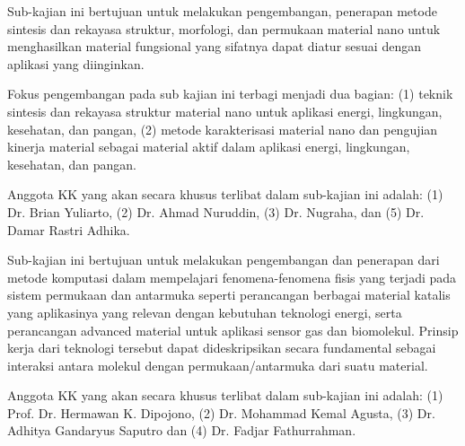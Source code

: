 \documentclass[a0,landscape]{a0poster}
\begin{document}
\begin{multicols}{3}
{\LARGE
\begin{tcolorbox}[
  colback=blue!5,
  colframe=blue!40!black,
  title=Sintesis dan Rekayasa permukaan material nano]
\vspace{1cm}
Sub-kajian ini bertujuan untuk melakukan pengembangan,
penerapan metode sintesis dan rekayasa 
struktur, morfologi, dan permukaan material nano untuk menghasilkan material fungsional 
yang sifatnya dapat diatur sesuai dengan aplikasi yang diinginkan.

Fokus pengembangan pada sub kajian ini terbagi menjadi dua bagian: (1) teknik sintesis dan 
rekayasa struktur material nano untuk aplikasi energi, lingkungan, kesehatan, dan pangan, 
(2) metode karakterisasi material nano dan pengujian kinerja material sebagai material 
aktif dalam aplikasi energi, lingkungan, kesehatan, dan pangan.

Anggota KK yang akan secara khusus terlibat dalam sub-kajian ini adalah: (1) Dr. Brian 
Yuliarto, (2) Dr. Ahmad Nuruddin, (3) Dr. Nugraha, dan (5) Dr. Damar Rastri Adhika.
\end{tcolorbox}
}

{\LARGE
\begin{tcolorbox}[
  colback=blue!5,
  colframe=blue!40!black,
  title=Komputasi multiskala pada sistem permukaan/antarmuka]
\vspace{1cm}
Sub-kajian ini bertujuan untuk melakukan pengembangan dan penerapan dari metode komputasi dalam mempelajari fenomena-fenomena fisis yang terjadi pada sistem permukaan dan antarmuka seperti perancangan berbagai material katalis yang aplikasinya yang relevan dengan kebutuhan teknologi energi, serta perancangan advanced material untuk aplikasi sensor gas dan biomolekul. Prinsip kerja dari teknologi tersebut dapat dideskripsikan secara fundamental sebagai interaksi antara molekul dengan permukaan/antarmuka dari suatu material. 

Anggota KK yang akan secara khusus terlibat dalam sub-kajian ini adalah: (1) Prof. Dr. Hermawan K. Dipojono, (2) Dr. Mohammad Kemal Agusta, (3) Dr. Adhitya Gandaryus Saputro dan (4) Dr. Fadjar Fathurrahman.
\end{tcolorbox}
}


\end{multicols}
\end{document}
